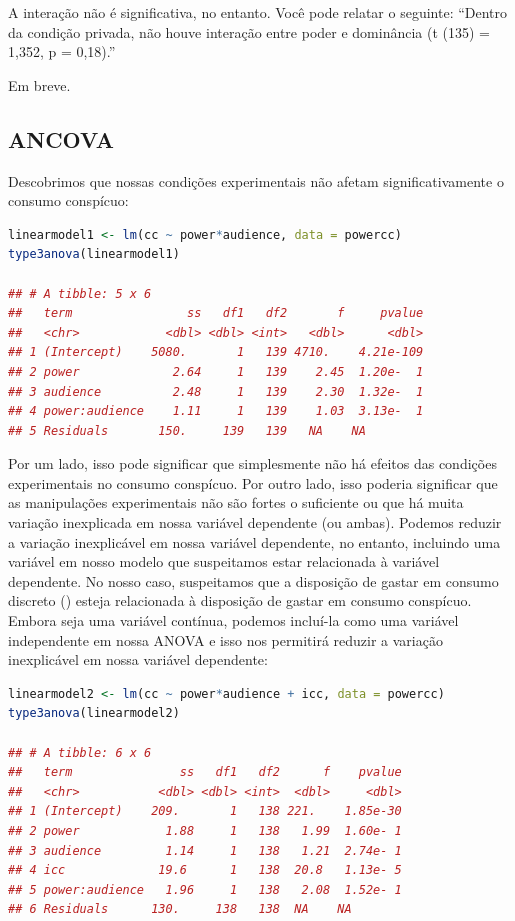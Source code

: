 \documentclass{article}
\begin{document}
A interação não é significativa, no entanto. Você pode relatar o seguinte: “Dentro da condição privada, não houve interação entre poder e dominância (t (135) = 1,352, p = 0,18).”

\vspace{.25cm}
\vspace{.25cm}


Em breve.

\subsection{ANCOVA}

Descobrimos que nossas condições experimentais não afetam significativamente o consumo conspícuo:

\begin{lstlisting}[language=R]
linearmodel1 <- lm(cc ~ power*audience, data = powercc)
type3anova(linearmodel1)

## # A tibble: 5 x 6
##   term                ss   df1   df2       f     pvalue
##   <chr>            <dbl> <dbl> <int>   <dbl>      <dbl>
## 1 (Intercept)    5080.       1   139 4710.    4.21e-109
## 2 power             2.64     1   139    2.45  1.20e-  1
## 3 audience          2.48     1   139    2.30  1.32e-  1
## 4 power:audience    1.11     1   139    1.03  3.13e-  1
## 5 Residuals       150.     139   139   NA    NA

\end{lstlisting}

Por um lado, isso pode significar que simplesmente não há efeitos das condições experimentais no consumo conspícuo. Por outro lado, isso poderia significar que as manipulações experimentais não são fortes o suficiente ou que há muita variação inexplicada em nossa variável dependente (ou ambas). Podemos reduzir a variação inexplicável em nossa variável dependente, no entanto, incluindo uma variável em nosso modelo que suspeitamos estar relacionada à variável dependente. No nosso caso, suspeitamos que a disposição de gastar em consumo discreto () esteja relacionada à disposição de gastar em consumo conspícuo. Embora  seja uma variável contínua, podemos incluí-la como uma variável independente em nossa ANOVA e isso nos permitirá reduzir a variação inexplicável em nossa variável dependente:

\begin{lstlisting}[language=R]
linearmodel2 <- lm(cc ~ power*audience + icc, data = powercc)
type3anova(linearmodel2)

## # A tibble: 6 x 6
##   term               ss   df1   df2      f    pvalue
##   <chr>           <dbl> <dbl> <int>  <dbl>     <dbl>
## 1 (Intercept)    209.       1   138 221.    1.85e-30
## 2 power            1.88     1   138   1.99  1.60e- 1
## 3 audience         1.14     1   138   1.21  2.74e- 1
## 4 icc             19.6      1   138  20.8   1.13e- 5
## 5 power:audience   1.96     1   138   2.08  1.52e- 1
## 6 Residuals      130.     138   138  NA    NA

\end{lstlisting}
\end{document}
